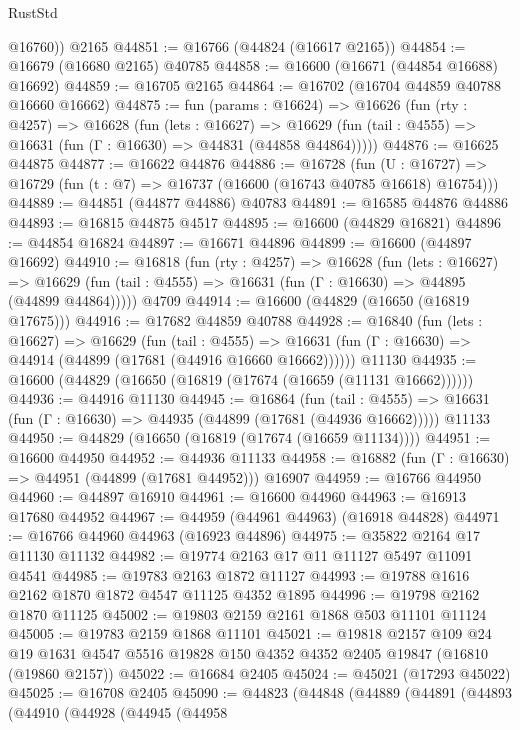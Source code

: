 \begin{lexlean}{RustStd}
\begin{coremodule}
        @16760))
    @2165
@44851 := @16766 (@44824 (@16617 @2165))
@44854 := @16679 (@16680 @2165) @40785
@44858 := @16600 (@16671 (@44854 @16688) @16692)
@44859 := @16705 @2165
@44864 := @16702 (@16704 @44859 @40788 @16660 @16662)
@44875 := fun (params : @16624) =>
  @16626
    (fun (rty : @4257) =>
    @16628
      (fun (lets : @16627) =>
      @16629 (fun (tail : @4555) => @16631 (fun (Γ : @16630) => @44831 (@44858 @44864)))))
@44876 := @16625 @44875
@44877 := @16622 @44876
@44886 := @16728
    (fun (U : @16727) => @16729 (fun (t : @7) => @16737 (@16600 (@16743 @40785 @16618) @16754)))
@44889 := @44851 (@44877 @44886) @40783
@44891 := @16585 @44876 @44886
@44893 := @16815 @44875 @4517
@44895 := @16600 (@44829 @16821)
@44896 := @44854 @16824
@44897 := @16671 @44896
@44899 := @16600 (@44897 @16692)
@44910 := @16818
    (fun (rty : @4257) =>
    @16628
      (fun (lets : @16627) =>
      @16629 (fun (tail : @4555) => @16631 (fun (Γ : @16630) => @44895 (@44899 @44864)))))
    @4709
@44914 := @16600 (@44829 (@16650 (@16819 @17675)))
@44916 := @17682 @44859 @40788
@44928 := @16840
    (fun (lets : @16627) =>
    @16629
      (fun (tail : @4555) =>
      @16631 (fun (Γ : @16630) => @44914 (@44899 (@17681 (@44916 @16660 @16662))))))
    @11130
@44935 := @16600 (@44829 (@16650 (@16819 (@17674 (@16659 (@11131 @16662))))))
@44936 := @44916 @11130
@44945 := @16864
    (fun (tail : @4555) => @16631 (fun (Γ : @16630) => @44935 (@44899 (@17681 (@44936 @16662)))))
    @11133
@44950 := @44829 (@16650 (@16819 (@17674 (@16659 @11134))))
@44951 := @16600 @44950
@44952 := @44936 @11133
@44958 := @16882 (fun (Γ : @16630) => @44951 (@44899 (@17681 @44952))) @16907
@44959 := @16766 @44950
@44960 := @44897 @16910
@44961 := @16600 @44960
@44963 := @16913 @17680 @44952
@44967 := @44959 (@44961 @44963) (@16918 @44828)
@44971 := @16766 @44960 @44963 (@16923 @44896)
@44975 := @35822 @2164 @17 @11130 @11132
@44982 := @19774 @2163 @17 @11 @11127 @5497 @11091 @4541
@44985 := @19783 @2163 @1872 @11127
@44993 := @19788 @1616 @2162 @1870 @1872 @4547 @11125 @4352 @1895
@44996 := @19798 @2162 @1870 @11125
@45002 := @19803 @2159 @2161 @1868 @503 @11101 @11124
@45005 := @19783 @2159 @1868 @11101
@45021 := @19818
    @2157
    @109
    @24
    @19
    @1631
    @4547
    @5516
    @19828
    @150
    @4352
    @4352
    @2405
    @19847
    (@16810 (@19860 @2157))
@45022 := @16684 @2405
@45024 := @45021 (@17293 @45022)
@45025 := @16708 @2405
@45090 := @44823
    (@44848
      (@44889
        (@44891
          (@44893
            (@44910
              (@44928
                (@44945
                  (@44958

\end{coremodule}
\end{lexlean}

